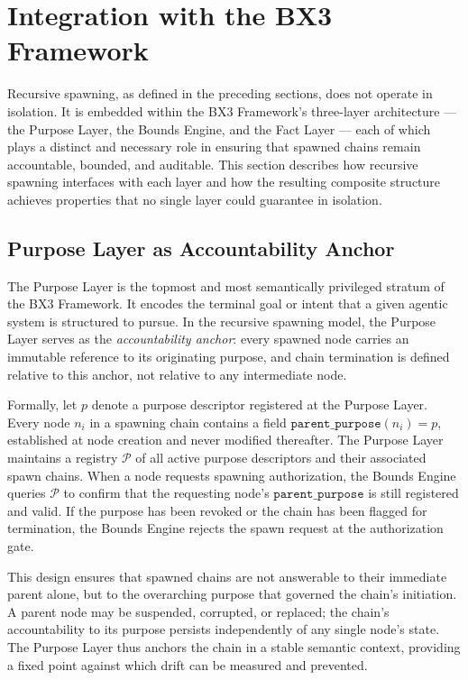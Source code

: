 \section{Integration with the BX3 Framework}
\label{sec:bxs-integration}

Recursive spawning, as defined in the preceding sections, does not operate in isolation. It is embedded within the BX3 Framework's three-layer architecture --- the Purpose Layer, the Bounds Engine, and the Fact Layer --- each of which plays a distinct and necessary role in ensuring that spawned chains remain accountable, bounded, and auditable. This section describes how recursive spawning interfaces with each layer and how the resulting composite structure achieves properties that no single layer could guarantee in isolation.

\subsection{Purpose Layer as Accountability Anchor}
\label{sec:purpose-layer-anchor}

The Purpose Layer is the topmost and most semantically privileged stratum of the BX3 Framework. It encodes the terminal goal or intent that a given agentic system is structured to pursue. In the recursive spawning model, the Purpose Layer serves as the \emph{accountability anchor}: every spawned node carries an immutable reference to its originating purpose, and chain termination is defined relative to this anchor, not relative to any intermediate node.

Formally, let $p$ denote a purpose descriptor registered at the Purpose Layer. Every node $n_i$ in a spawning chain contains a field $\texttt{parent\_purpose}(n_i) = p$, established at node creation and never modified thereafter. The Purpose Layer maintains a registry $\mathcal{P}$ of all active purpose descriptors and their associated spawn chains. When a node requests spawning authorization, the Bounds Engine queries $\mathcal{P}$ to confirm that the requesting node's $\texttt{parent\_purpose}$ is still registered and valid. If the purpose has been revoked or the chain has been flagged for termination, the Bounds Engine rejects the spawn request at the authorization gate.

This design ensures that spawned chains are not answerable to their immediate parent alone, but to the overarching purpose that governed the chain's initiation. A parent node may be suspended, corrupted, or replaced; the chain's accountability to its purpose persists independently of any single node's state. The Purpose Layer thus anchors the chain in a stable semantic context, providing a fixed point against which drift can be measured and prevented.

